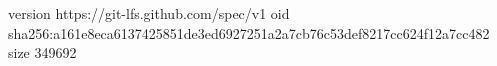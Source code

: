 version https://git-lfs.github.com/spec/v1
oid sha256:a161e8eca6137425851de3ed6927251a2a7cb76c53def8217cc624f12a7cc482
size 349692
